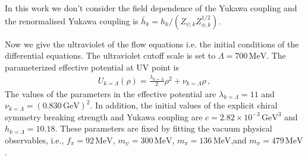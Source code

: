 \documentclass[%
reprint,
superscriptaddress,
showpacs,preprintnumbers,
 amsmath,amssymb,
 aps,
prd,
]{revtex4-1}
\begin{document}
In this work we don't consider the field dependence of the Yukawa coupling and the renormalised Yukawa coupling is $\bar{h}_k=h_k/(Z_{\psi,k}Z^{1/2}_{\phi,k})$.\par
Now we give the ultraviolet of the flow equations i.e. the initial conditions of the differential equations. The ultraviolet cutoff scale is set to $\Lambda=700\,\mathrm{MeV}$. The parameterized effective potential at UV point is
\begin{align}
U_{k=\Lambda}(\rho)=\frac{\lambda_{k=\Lambda}}{2}\rho^2+\nu_{k=\Lambda}\rho\,,
\end{align}
The values of the parameters in the effective potential are $\lambda_{k=\Lambda}=11$ and $\nu_{k=\Lambda}=(0.830\,\mathrm{GeV})^2$. In addition, the initial values of the explicit chiral symmetry breaking strength and Yukawa coupling are $c=2.82\times 10^{-3}\,\mathrm{GeV}^3$ and $h_{k=\Lambda}=10.18$. These parameters are fixed by fitting the vacuum physical observables, i.e., $f_\pi=92\,\mathrm{MeV}$, $m_\psi=300\,\mathrm{MeV}$, $m_\pi=136\,\mathrm{MeV}$,and $m_\sigma=479\,\mathrm{MeV}$.




\end{document}
